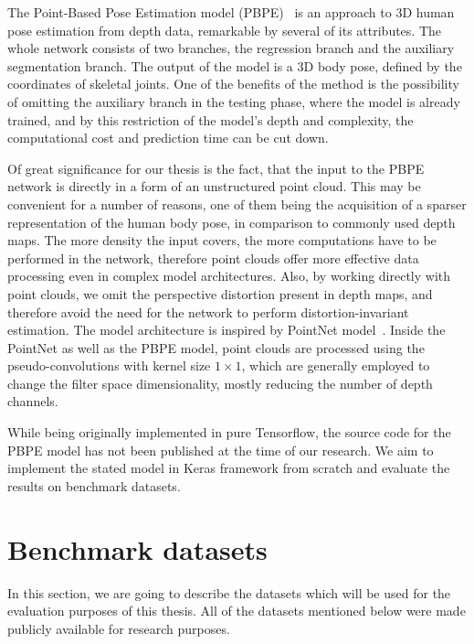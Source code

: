 The Point-Based Pose Estimation model (PBPE)~\cite{Ali19} is an approach to 3D human pose estimation from depth data, remarkable by several of its attributes. The whole network consists of two branches, the regression branch and the auxiliary segmentation branch. The output of the model is a 3D body pose, defined by the coordinates of skeletal joints. One of the benefits of the method is the possibility of omitting the auxiliary branch in the testing phase, where the model is already trained, and by this restriction of the model's depth and complexity, the computational cost and prediction time can be cut down.\par
\vspace{5mm}
\noindent Of great significance for our thesis is the fact, that the input to the PBPE network is directly in a form of an unstructured point cloud. This may be convenient for a number of reasons, one of them being the acquisition of a sparser representation of the human body pose, in comparison to commonly used depth maps. The more density the input covers, the more computations have to be performed in the network, therefore point clouds offer more effective data processing even in complex model architectures. Also, by working directly with point clouds, we omit the perspective distortion present in depth maps, and therefore avoid the need for the network to perform distortion-invariant estimation. The model architecture is inspired by PointNet model~\cite{DBLP:journals/corr/QiSMG16}. Inside the PointNet as well as the PBPE model, point clouds are processed using the pseudo-convolutions with kernel size $1 \times 1$, which are generally employed to change the filter space dimensionality, mostly reducing the number of depth channels.\par %
\vspace{5mm}
\noindent While being originally implemented in pure Tensorflow, the source code for the PBPE model has not been published at the time of our research. We aim to implement the stated model in Keras framework from scratch and evaluate the results on benchmark datasets.

\section{Benchmark datasets}

In this section, we are going to describe the datasets which will be used for the evaluation purposes of this thesis. All of the datasets mentioned below were made publicly available for research purposes.
